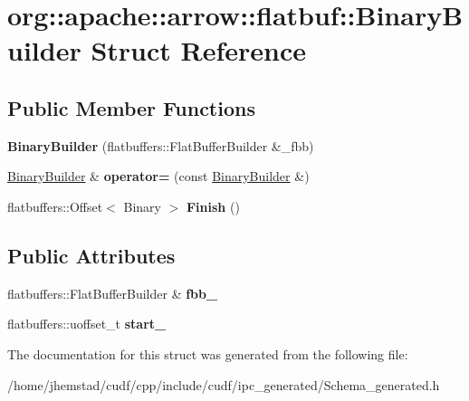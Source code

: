 \hypertarget{structorg_1_1apache_1_1arrow_1_1flatbuf_1_1BinaryBuilder}{}\section{org\+:\+:apache\+:\+:arrow\+:\+:flatbuf\+:\+:Binary\+Builder Struct Reference}
\label{structorg_1_1apache_1_1arrow_1_1flatbuf_1_1BinaryBuilder}
\subsection*{Public Member Functions}
\begin{DoxyCompactItemize}
\item 
{\bfseries Binary\+Builder} (flatbuffers\+::\+Flat\+Buffer\+Builder \&\+\_\+fbb)\hypertarget{structorg_1_1apache_1_1arrow_1_1flatbuf_1_1BinaryBuilder_a716a94b24406978220002c875fd5a15b}{}\label{structorg_1_1apache_1_1arrow_1_1flatbuf_1_1BinaryBuilder_a716a94b24406978220002c875fd5a15b}

\item 
\hyperlink{structorg_1_1apache_1_1arrow_1_1flatbuf_1_1BinaryBuilder}{Binary\+Builder} \& {\bfseries operator=} (const \hyperlink{structorg_1_1apache_1_1arrow_1_1flatbuf_1_1BinaryBuilder}{Binary\+Builder} \&)\hypertarget{structorg_1_1apache_1_1arrow_1_1flatbuf_1_1BinaryBuilder_a1b74f130a62184f89417cf6f5d754cbe}{}\label{structorg_1_1apache_1_1arrow_1_1flatbuf_1_1BinaryBuilder_a1b74f130a62184f89417cf6f5d754cbe}

\item 
flatbuffers\+::\+Offset$<$ Binary $>$ {\bfseries Finish} ()\hypertarget{structorg_1_1apache_1_1arrow_1_1flatbuf_1_1BinaryBuilder_a615f1411b64ba4f7636b1be83521ad49}{}\label{structorg_1_1apache_1_1arrow_1_1flatbuf_1_1BinaryBuilder_a615f1411b64ba4f7636b1be83521ad49}

\end{DoxyCompactItemize}
\subsection*{Public Attributes}
\begin{DoxyCompactItemize}
\item 
flatbuffers\+::\+Flat\+Buffer\+Builder \& {\bfseries fbb\+\_\+}\hypertarget{structorg_1_1apache_1_1arrow_1_1flatbuf_1_1BinaryBuilder_a785d71df1583c760ec81822b1772350e}{}\label{structorg_1_1apache_1_1arrow_1_1flatbuf_1_1BinaryBuilder_a785d71df1583c760ec81822b1772350e}

\item 
flatbuffers\+::uoffset\+\_\+t {\bfseries start\+\_\+}\hypertarget{structorg_1_1apache_1_1arrow_1_1flatbuf_1_1BinaryBuilder_a40c1637979e2fba53c054bc972fddf10}{}\label{structorg_1_1apache_1_1arrow_1_1flatbuf_1_1BinaryBuilder_a40c1637979e2fba53c054bc972fddf10}

\end{DoxyCompactItemize}


The documentation for this struct was generated from the following file\+:\begin{DoxyCompactItemize}
\item 
/home/jhemstad/cudf/cpp/include/cudf/ipc\+\_\+generated/Schema\+\_\+generated.\+h\end{DoxyCompactItemize}
